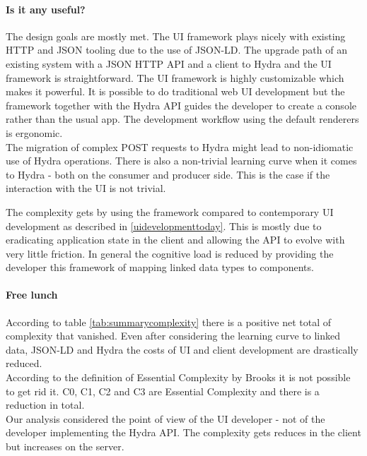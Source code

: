 \paragraph{Is it any useful?}
The design goals are mostly met. The UI framework plays nicely with existing HTTP and JSON tooling due to the use of JSON-LD. The upgrade path of an existing system with a JSON HTTP API and a client to Hydra and the UI framework is straightforward. The UI framework is highly customizable which makes it powerful. It is possible to do traditional web UI development but the framework together with the Hydra API guides the developer to create a console rather than the usual app. The development workflow using the default renderers is ergonomic. \\
The migration of complex POST requests to Hydra might lead to non-idiomatic use of Hydra operations. There is also a non-trivial learning curve when it comes to Hydra - both on the consumer and producer side. This is the case if the interaction with the UI is not trivial.

The complexity gets by using the framework compared to contemporary UI development as described in \ref{uidevelopmenttoday}. This is mostly due to eradicating application state in the client and allowing the API to evolve with very little friction. In general the cognitive load is reduced by providing the developer this framework of mapping linked data types to components.

\paragraph{Free lunch}
According to table \ref{tab:summarycomplexity} there is a positive net total of complexity that vanished. Even after considering the learning curve to linked data, JSON-LD and Hydra the costs of UI and client development are drastically reduced. \\
According to the definition of Essential Complexity by Brooks it is not possible to get rid it. C0, C1, C2 and C3 are Essential Complexity and there is a reduction in total. \\
Our analysis considered the point of view of the UI developer - not of the developer implementing the Hydra API. The complexity gets reduces in the client but increases on the server.

